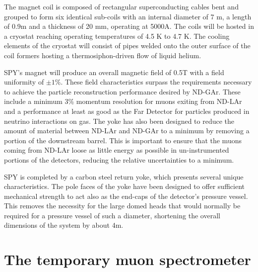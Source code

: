The magnet coil is composed of rectangular superconducting cables bent and grouped to form six identical sub-coils with an internal diameter of 7 m, a length of 0.9m and a thickness of 20 mm, operating at 5000A. The coils will be hosted in a cryostat reaching operating temperatures of 4.5 K to 4.7 K. The cooling elements of the cryostat will consist of pipes welded onto the outer surface of the coil formers hosting a thermosiphon-driven flow of liquid helium. 

SPY's magnet will produce an overall magnetic field of 0.5T with a field uniformity of $\pm 1\%$. These field characteristics surpass the requirements necessary to achieve the particle reconstruction performance desired by ND-GAr. These include a minimum 3\% momentum resolution for muons exiting from ND-LAr and a performance at least as good as the Far Detector for particles produced in neutrino interactions on gas. The yoke has also been designed to reduce the amount of material between ND-LAr and ND-GAr to a minimum by removing a portion of the downstream barrel. This is important to ensure that the muons coming from ND-LAr loose as little energy as possible in un-instrumented portions of the detectors, reducing the relative uncertainties to a minimum.

SPY is completed by a carbon steel return yoke, which presents several unique characteristics. The pole faces of the yoke have been designed to offer sufficient mechanical strength to act also as the end-caps of the detector's pressure vessel. This removes the necessity for the large domed heads that would normally be required for a pressure vessel of such a diameter, shortening the overall dimensions of the system by about 4m.

\section{The temporary muon spectrometer}
